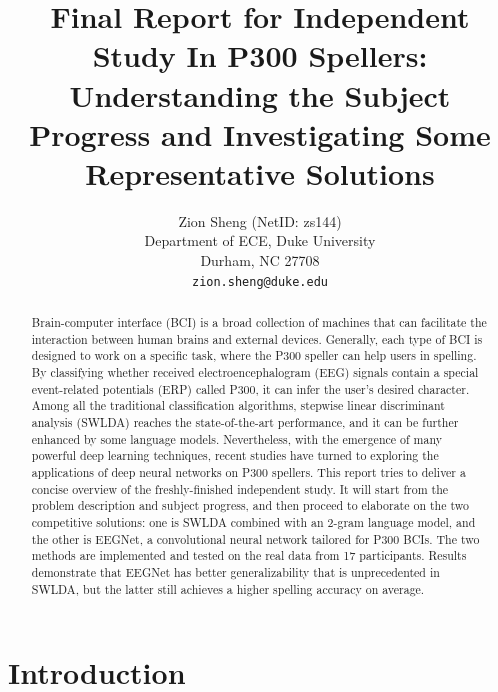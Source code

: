 \documentclass{article}
\title{Final Report for Independent Study In P300 Spellers: Understanding the Subject Progress and Investigating Some Representative Solutions}
\author{
	Zion Sheng (NetID: zs144)\\
	Department of ECE, Duke University\\
	Durham, NC 27708 \\
	\texttt{zion.sheng@duke.edu} \\
}
\date{} %
\begin{document}
\maketitle

\vspace{-10mm}
\begin{abstract}
	Brain-computer interface (BCI) is a broad collection of machines that can facilitate the interaction between human brains and external devices. Generally, each type of BCI is designed to work on a specific task, where the P300 speller can help users in spelling. By classifying whether received electroencephalogram (EEG) signals contain a special event-related potentials (ERP) called P300, it can infer the user's desired character. Among all the traditional classification algorithms, stepwise linear discriminant analysis (SWLDA) reaches the state-of-the-art performance, and it can be further enhanced by some language models. Nevertheless, with the emergence of many powerful deep learning techniques, recent studies have turned to exploring the applications of deep neural networks on P300 spellers. This report tries to deliver a concise overview of the freshly-finished independent study. It will start from the problem description and subject progress, and then proceed to elaborate on the two competitive solutions: one is SWLDA combined with an 2-gram language model, and the other is EEGNet, a convolutional neural network tailored for P300 BCIs. The two methods are implemented and tested on the real data from 17 participants. Results demonstrate that EEGNet has better generalizability that is unprecedented in SWLDA, but the latter still achieves a higher spelling accuracy on average.
\end{abstract}




\section{Introduction} \label{Description}
\end{document}
